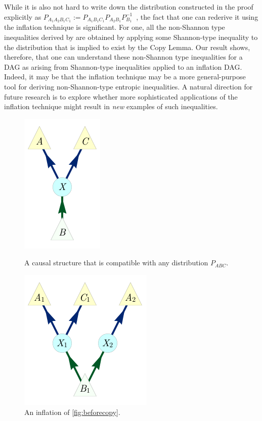 \documentclass[aps,english,10pt,superscriptaddress,onecolumn,twoside,longbibliography,pra,floatfix,fleqn,nofootinbib]{revtex4-1}%
\theoremstyle{definition}
\newcounter{example}[section]
\begin{document}
While it is also not hard to write down the distribution constructed in the proof explicitly as $P_{A_1 A_2 B_1 C_1} := P_{A_1 B_1 C_1} P_{A_2 B_1} P_{B_1}^{-1}$~\cite[Lemma~15.8]{yeung_network_2008}, the fact that one can rederive it using the inflation technique is significant.  For one, all the non-Shannon type inequalities derived by \citet{zeger_2011_nonshannon} are obtained by applying some Shannon-type inequality to the distribution that is implied to exist by the Copy Lemma.  Our result shows, therefore, that one can understand these non-Shannon type inequalities for a DAG as arising from Shannon-type inequalities applied to an inflation DAG.  Indeed, it may be that the inflation technique may be a more general-purpose tool for deriving non-Shannon-type entropic inequalities.  A natural direction for future research is to explore whether more sophisticated applications of the inflation technique might result  in \emph{new} examples of such inequalities. 


\begin{figure}[H]
\centering
\begin{minipage}[t]{0.4\linewidth}
\centering
\includegraphics[scale=1]{shannonNOcopyV1.pdf}
\caption{A causal structure that is compatible with any distribution $P_{ABC}$.}\label{fig:beforecopy}
\end{minipage}
\hfill
\begin{minipage}[t]{0.4\linewidth}
\centering
\includegraphics[scale=1]{shannonYEScopyV1.pdf}
\caption{An inflation of \cref{fig:beforecopy}.}\label{fig:aftercopy}
\end{minipage}
\end{figure}
\end{document}
